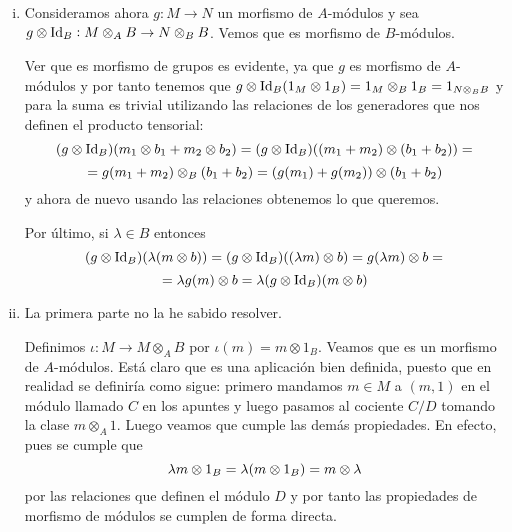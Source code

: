 \documentclass[../../../main.tex]{subfiles}
\begin{document}
\begin{sol}
\begin{enumerate}[(i)]
    \item Consideramos ahora $g:M\to N$ un morfismo de $A$-módulos y sea $g\otimes\operatorname{Id}_B:M\otimes_AB\to N\otimes_BB$. Vemos que es morfismo de $B$-módulos.
    
    Ver que es morfismo de grupos es evidente, ya que $g$ es morfismo de $A$-módulos y por tanto tenemos que $g\otimes\operatorname{Id}_B(1_M\otimes 1_B) = 1_M\otimes_B1_B = 1_{N\otimes_BB}$ y para la suma es trivial utilizando las relaciones de los generadores que nos definen el producto tensorial:
    \begin{equation}
        \notag
        (g\otimes\operatorname{Id}_B)(m_1\otimes b_1 + m_2\otimes b_2) = (g\otimes \operatorname{Id}_B)((m_1+m_2)\otimes (b_1+b_2)) = 
    \end{equation}
    \begin{equation}
        \notag
        = g(m_1+m_2)\otimes_B(b_1+b_2) = (g(m_1)+g(m_2))\otimes (b_1+b_2)
    \end{equation}
    y ahora de nuevo usando las relaciones obtenemos lo que queremos.
    
    Por último, si $\lambda\in B$ entonces
    \begin{equation}
        \notag
        (g\otimes\operatorname{Id}_B)(\lambda(m\otimes b))=(g\otimes\operatorname{Id}_B)((\lambda m)\otimes b) = g(\lambda m)\otimes b = 
    \end{equation}
    \begin{equation}
        \notag
         = \lambda g(m)\otimes b = \lambda(g\otimes\operatorname{Id}_B)(m\otimes b)
    \end{equation}
    
    \item La primera parte no la he sabido resolver.
    
    Definimos $\iota:M\to M\otimes_AB$ por $\iota(m) = m\otimes 1_B$. Veamos que es un morfismo de $A$-módulos. Está claro que es una aplicación bien definida, puesto que en realidad se definiría como sigue: primero mandamos $m\in M$ a $(m,1)$ en el módulo llamado $C$ en los apuntes y luego pasamos al cociente $C/D$ tomando la clase $m\otimes_A1$. Luego veamos que cumple las demás propiedades. En efecto, pues se cumple que 
    \begin{equation}
        \notag
        \lambda m\otimes 1_B = \lambda(m\otimes 1_B) = m\otimes \lambda
    \end{equation}
    por las relaciones que definen el módulo $D$ y por tanto las propiedades de morfismo de módulos se cumplen de forma directa.
    

\end{enumerate}
\end{sol}
\end{document}
